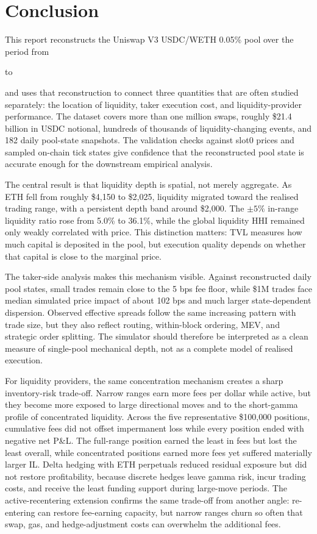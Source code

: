 \documentclass[11pt]{article}
\begin{document}






\section{Conclusion}
\label{sec:conclusion}

This report reconstructs the Uniswap V3 USDC/WETH 0.05\% pool over the period from 
\date{1st of October 2025} to \date{31st of March 2026} and uses that reconstruction 
to connect three quantities that are often studied separately: the location of liquidity, taker 
execution cost, and liquidity-provider performance. The dataset covers more than one million swaps, 
roughly \$21.4 billion in USDC notional, hundreds of thousands of liquidity-changing events, and 182 daily 
pool-state snapshots. The validation checks against slot0 prices and sampled on-chain tick states give 
confidence that the reconstructed pool state is accurate enough for the downstream empirical analysis.

The central result is that liquidity depth is spatial, not merely aggregate. As ETH fell from roughly 
\$4,150 to \$2,025, liquidity migrated toward the realised trading range, with a persistent depth band 
around \$2,000. The \(\pm 5\%\) in-range liquidity ratio rose from 5.0\% to 36.1\%, while the global 
liquidity HHI remained only weakly correlated with price. This distinction matters: TVL measures how 
much capital is deposited in the pool, but execution quality depends on whether that capital is close to 
the marginal price.

The taker-side analysis makes this mechanism visible. Against reconstructed daily pool states, small trades 
remain close to the 5 bps fee floor, while \$1M trades face median simulated price impact of about 102 bps 
and much larger state-dependent dispersion. Observed effective spreads follow the same increasing pattern 
with trade size, but they also reflect routing, within-block ordering, MEV, and strategic order splitting. 
The simulator should therefore be interpreted as a clean measure of single-pool mechanical depth, not as a 
complete model of realised execution.

For liquidity providers, the same concentration mechanism creates a sharp inventory-risk trade-off. Narrow 
ranges earn more fees per dollar while active, but they become more exposed to large directional moves and 
to the short-gamma profile of concentrated liquidity. Across the five representative \$100,000 positions, 
cumulative fees did not offset impermanent loss while every position ended with negative net P\&L. The 
full-range position earned the least in fees but lost the least overall, while concentrated positions earned 
more fees yet suffered materially larger IL. Delta hedging with ETH perpetuals reduced residual exposure 
but did not restore profitability, because discrete hedges leave gamma risk, incur trading costs, and receive 
the least funding support during large-move periods. The active-recentering extension confirms the same
trade-off from another angle: re-entering can restore fee-earning capacity, but narrow ranges churn so often
that swap, gas, and hedge-adjustment costs can overwhelm the additional fees.
\end{document}
